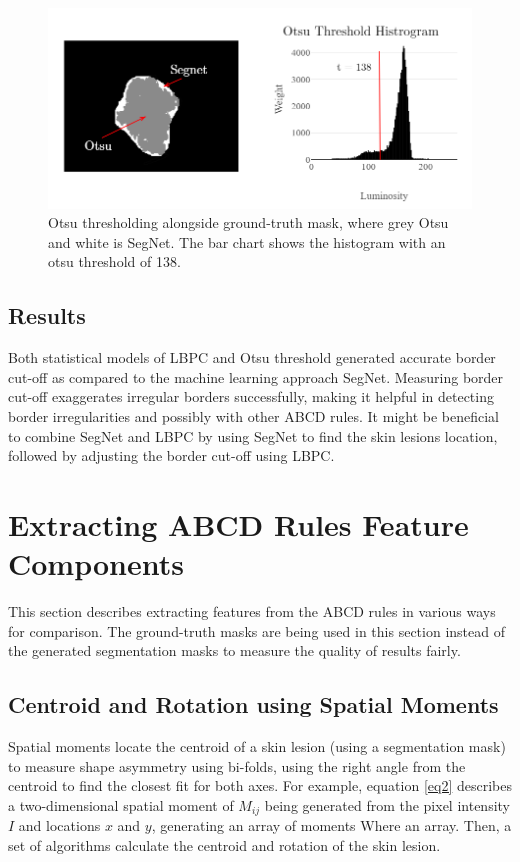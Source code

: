 \documentclass[10.5pt]{report}
\begin{document}
\begin{figure}
\centering
\includegraphics[scale=0.7]{otsu3.png}
\caption{Otsu thresholding alongside ground-truth mask, where grey Otsu and white is SegNet. The bar chart shows the histogram with an otsu threshold of 138.} \label{otsu2}
\end{figure}

\subsection{Results}
Both statistical models of LBPC and Otsu threshold generated accurate border cut-off as compared to the machine learning approach SegNet. Measuring border cut-off exaggerates irregular borders successfully, making it helpful in detecting border irregularities and possibly with other ABCD rules. It might be beneficial to combine SegNet and LBPC by using SegNet to find the skin lesions location, followed by adjusting the border cut-off using LBPC.

\section{Extracting ABCD Rules Feature Components}
This section describes extracting features from the ABCD rules in various ways for comparison. The ground-truth masks are being used in this section instead of the generated segmentation masks to measure the quality of results fairly.

\subsection{Centroid and Rotation using Spatial Moments}
Spatial moments locate the centroid of a skin lesion (using a segmentation mask) to measure shape asymmetry using bi-folds, using the right angle from the centroid to find the closest fit for both axes. For example, equation \ref{eq2} describes a two-dimensional spatial moment of $M_{ij}$ being generated from the pixel intensity $I$ and locations $x$ and $y$, generating an array of moments Where an array. Then, a set of algorithms calculate the centroid and rotation of the skin lesion.
\end{document}
